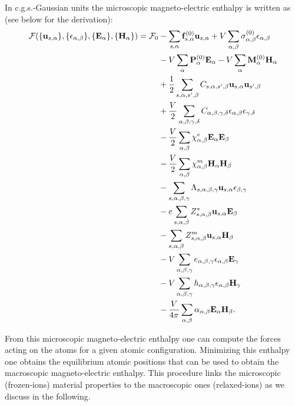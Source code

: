 \documentclass[12pt,a4paper,twoside]{report}
\begin{document}
\newpage
{\color{orange} In c.g.s.-Gaussian units the microscopic
magneto-electric enthalpy is written as (see below for the derivation):
\begin{align}
\mathcal{F}(\{{\bf u}_{s,\alpha}\}, \{\epsilon_{\alpha,\beta}\},
\{ {\bf E}_\alpha\}, \{{\bf H}_\alpha\})=\mathcal{F}_0 &-
\sum_{s,\alpha} {\bf f}^{(0)}_{s,\alpha} {\bf u}_{s,\alpha}+ 
V \sum_{\alpha,\beta}
\sigma^{(0)}_{\alpha,\beta} \epsilon_{\alpha,\beta} \nonumber \\ 
&- V \sum_{\alpha} {\bf P}^{(0)}_\alpha {\bf E}_\alpha - 
V \sum_{\alpha}
{\bf M}^{(0)}_\alpha {\bf H}_\alpha \nonumber \\
&+ {1\over 2}
\sum_{s,\alpha,s',\beta} C_{s,\alpha,s',\beta} {\bf u}_{s,\alpha}
{\bf u}_{s',\beta}\nonumber \\
&+ {V\over 2}\sum_{\alpha,\beta,\gamma,\delta} 
C_{\alpha,\beta,\gamma,\delta}  
\epsilon_{\alpha,\beta}
\epsilon_{\gamma,\delta} \nonumber \\
&- {V\over 2} \sum_{\alpha,\beta} 
\chi^e_{\alpha,\beta}
{\bf E}_{\alpha}
{\bf E}_{\beta} \nonumber \\
&- {V \over 2}  \sum_{\alpha,\beta} 
\chi^m_{\alpha,\beta}
{\bf H}_{\alpha}
{\bf H}_{\beta} \nonumber \\
&- \sum_{s,\alpha,\beta,\gamma}
\Lambda_{s,\alpha,\beta,\gamma} {\bf u}_{s,\alpha}
\epsilon_{\beta,\gamma}\nonumber \\
&- e\sum_{s,\alpha,\beta} Z^*_{s,\alpha,\beta} 
{\bf u}_{s,\alpha} {\bf E}_{\beta} \nonumber \\
&- \sum_{s,\alpha,\beta} 
Z^m_{s,\alpha,\beta} {\bf u}_{s,\alpha}{\bf H}_{\beta} \nonumber \\
&- V \sum_{\alpha,\beta,\gamma} e_{\alpha,\beta,\gamma} 
\epsilon_{\alpha,\beta} {\bf E}_{\gamma} \nonumber \\
&- V \sum_{\alpha,\beta,\gamma}  h_{\alpha,\beta,\gamma} 
\epsilon_{\alpha,\beta} {\bf H}_{\gamma} \nonumber \\
&- {V \over 4 \pi} \sum_{\alpha,\beta} 
\alpha_{\alpha,\beta} {\bf E}_{\alpha}
{\bf H}_{\beta}.
\end{align}
}

\newpage
From this microscopic magneto-electric enthalpy one can compute the forces
acting on the atoms for a given atomic configuration. Minimizing this
enthalpy one obtains the equilibrium atomic positions that can be used
to obtain the macroscopic magneto-electric enthalpy. This procedure
links the microscopic (frozen-ions) material properties to the
macroscopic ones (relaxed-ions) as we discuss in the following. 
\end{document}
